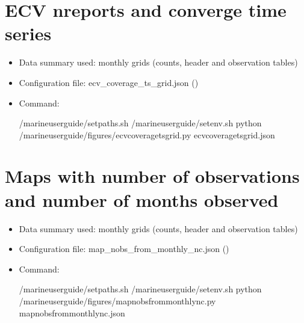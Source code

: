 \documentclass[letterpaper,10pt,english]{sphinxmanual}
\begin{document}
\section{ECV nreports and converge time series}
\label{\detokenize{index:ecv-nreports-and-converge-time-series}}\begin{itemize}
\item {} 
Data summary used: monthly grids (counts, header and observation tables)

\item {} 
Configuration file: ecv\_coverage\_ts\_grid.json ({\hyperref[\detokenize{index:ecv-coverage-config}]{}})

\item {} 
Command:

\begin{sphinxVerbatim}[commandchars=\\\{\}]
 /marine\PYGZhy{}user\PYGZhy{}guide/setpaths.sh
 /marine\PYGZhy{}user\PYGZhy{}guide/setenv.sh
python /marine\PYGZhy{}user\PYGZhy{}guide/figures/ecv\PYGZus{}coverage\PYGZus{}ts\PYGZus{}grid.py ecv\PYGZus{}coverage\PYGZus{}ts\PYGZus{}grid.json
\end{sphinxVerbatim}

\end{itemize}


\section{Maps with number of observations and number of months observed}
\label{\detokenize{index:maps-with-number-of-observations-and-number-of-months-observed}}\begin{itemize}
\item {} 
Data summary used: monthly grids (counts, header and observation tables)

\item {} 
Configuration file: map\_nobs\_from\_monthly\_nc.json ({\hyperref[\detokenize{index:map-nobs-config}]{}})

\item {} 
Command:

\begin{sphinxVerbatim}[commandchars=\\\{\}]
 /marine\PYGZhy{}user\PYGZhy{}guide/setpaths.sh
 /marine\PYGZhy{}user\PYGZhy{}guide/setenv.sh
python /marine\PYGZhy{}user\PYGZhy{}guide/figures/map\PYGZus{}nobs\PYGZus{}from\PYGZus{}monthly\PYGZus{}nc.py map\PYGZus{}nobs\PYGZus{}from\PYGZus{}monthly\PYGZus{}nc.json
\end{sphinxVerbatim}

\end{itemize}
\end{document}
